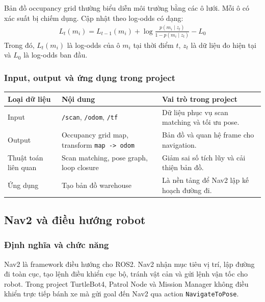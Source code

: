 Bản đồ occupancy grid thường biểu diễn môi trường bằng các ô lưới. Mỗi ô
có xác suất bị chiếm dụng. Cập nhật theo log-odds có dạng:
\begin{gather*}L_{t}\left( m_{i} \right) = L_{t - 1}\left( m_{i} \right) + \log\frac{p\left( m_{i} \mid z_{t} \right)}{1 - p\left( m_{i} \mid z_{t} \right)} - L_{0}\end{gather*}
Trong đó, \(L_{t}\left( m_{i} \right)\) là log-odds của ô \(m_{i}\) tại
thời điểm \(t\), \(z_{t}\) là dữ liệu đo hiện tại và \(L_{0}\) là
log-odds ban đầu.

\subsubsection{Input, output và ứng dụng trong project}

\renewcommand{\arraystretch}{1.25}
\begin{longtable}{|
  >{\raggedright\arraybackslash}p{}|
  >{\raggedright\arraybackslash}p{}|
  >{\raggedright\arraybackslash}p{}|}
\hline
\textbf{Loại dữ liệu} & \textbf{Nội dung} & \textbf{Vai trò trong project} \\ \hline
\hline
\endhead
\hline
\endlastfoot
Input & \texttt{/scan}, \texttt{/odom}, \texttt{/tf} & Dữ liệu phục vụ
scan matching và tối ưu pose. \\ \hline
Output & Occupancy grid map, transform
\texttt{map -> odom} & Bản đồ và quan hệ frame cho
navigation. \\ \hline
Thuật toán liên quan & Scan matching, pose graph, loop closure & Giảm
sai số tích lũy và cải thiện bản đồ. \\ \hline
Ứng dụng & Tạo bản đồ warehouse & Là nền tảng để Nav2 lập kế hoạch đường
đi. \\ \hline
\end{longtable}

\subsection{Nav2 và điều hướng robot}\label{subsec:nav2}

\subsubsection{Định nghĩa và chức năng}

Nav2 là framework điều hướng cho ROS2. Nav2 nhận mục tiêu vị trí, lập
đường đi toàn cục, tạo lệnh điều khiển cục bộ, tránh vật cản và gửi lệnh
vận tốc cho robot. Trong project TurtleBot4, Patrol Node và Mission
Manager không điều khiển trực tiếp bánh xe mà gửi goal đến Nav2 qua
action \texttt{NavigateToPose}.

